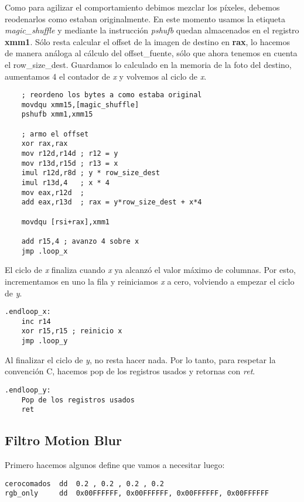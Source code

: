 \documentclass[a4paper]{article}
\begin{document}
Como para agilizar el comportamiento debimos mezclar los p\'ixeles, debemos reodenarlos como estaban originalmente. En este momento usamos la etiqueta \emph{magic_shuffle} y mediante la instrucci\'on \textit{pshufb} quedan almacenados en el registro \textbf{xmm1}. S\'olo resta calcular el offset de la imagen de destino en \textbf{rax}, lo hacemos de manera an\'aloga al c\'alculo del offset_fuente, s\'olo que ahora tenemos en cuenta el row_size_dest. Guardamos lo calculado en la memoria de la foto del destino, aumentamos 4 el contador de \emph{x} y volvemos al ciclo de \emph{x}.
\begin{codesnippet}
\begin{verbatim}
    ; reordeno los bytes a como estaba original
    movdqu xmm15,[magic_shuffle] 
    pshufb xmm1,xmm15
    
    ; armo el offset
    xor rax,rax
    mov r12d,r14d ; r12 = y
    mov r13d,r15d ; r13 = x
    imul r12d,r8d ; y * row_size_dest
    imul r13d,4   ; x * 4 
    mov eax,r12d  ; 
    add eax,r13d  ; rax = y*row_size_dest + x*4 

    movdqu [rsi+rax],xmm1

    add r15,4 ; avanzo 4 sobre x
    jmp .loop_x
\end{verbatim}
\end{codesnippet}

El ciclo de \emph{x} finaliza cuando \emph{x} ya alcanz\'o el valor m\'aximo de columnas. Por esto, incrementamos en uno la fila y reiniciamos \emph{x} a cero, volviendo a empezar el ciclo de \emph{y}.
\begin{codesnippet}
\begin{verbatim}
.endloop_x:
    inc r14
    xor r15,r15 ; reinicio x
    jmp .loop_y
\end{verbatim}
\end{codesnippet}

Al finalizar el ciclo de \emph{y}, no resta hacer nada. Por lo tanto, para respetar la convenci\'on C, hacemos pop de los registros usados y retornas con \textit{ret}.
\begin{codesnippet}
\begin{verbatim}
.endloop_y:
    Pop de los registros usados
    ret
\end{verbatim}
\end{codesnippet}




\newpage
\subsection{Filtro Motion Blur}
\indent Primero hacemos algunos define que vamos a necesitar luego:
 \begin{codesnippet}
\begin{verbatim}
cerocomados  dd  0.2 , 0.2 , 0.2 , 0.2
rgb_only     dd  0x00FFFFFF, 0x00FFFFFF, 0x00FFFFFF, 0x00FFFFFF
\end{verbatim}
\end{codesnippet}
\end{document}
